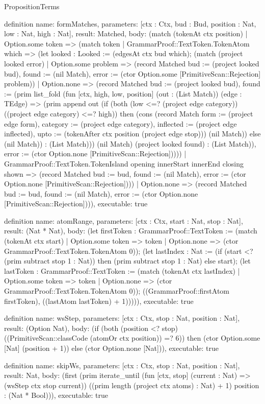 \begin{lexlean}{PropositionTerms}
\begin{semanticmodule}
definition{
  name: formMatches,
  parameters: [ctx : Ctx, bud : Bud, position : Nat, low : Nat, high : Nat],
  result: Matched,
  body: (match (tokenAt ctx position)
    | Option.some token => (match token
      | GrammarProof::TextToken.TokenAtom which => (let looked : Looked := (edgesAt ctx bud which); (match (project looked error)
        | Option.some problem => (record Matched {bud := (project looked bud), found := (nil Match), error := (ctor Option.some [PrimitiveScan::Rejection] problem)})
        | Option.none => (record Matched {bud := (project looked bud), found := (prim list_fold (fun [ctx, high, low, position] (out : (List Match)) (edge : TEdge) => (prim append out (if (both (low <=? (project edge category)) ((project edge category) <=? high)) then (cons (record Match {form := (project edge form), category := (project edge category), inflected := (project edge inflected), upto := (tokenAfter ctx position (project edge stop))}) (nil Match)) else (nil Match)) : (List Match))) (nil Match) (project looked found) : (List Match)), error := (ctor Option.none [PrimitiveScan::Rejection])})))
      | GrammarProof::TextToken.TokenIsland opening innerStart innerEnd closing shown => (record Matched {bud := bud, found := (nil Match), error := (ctor Option.none [PrimitiveScan::Rejection])}))
    | Option.none => (record Matched {bud := bud, found := (nil Match), error := (ctor Option.none [PrimitiveScan::Rejection])})),
  executable: true
}

definition{
  name: atomRange,
  parameters: [ctx : Ctx, start : Nat, stop : Nat],
  result: (Nat * Nat),
  body: (let firstToken : GrammarProof::TextToken := (match (tokenAt ctx start)
    | Option.some token => token
    | Option.none => (ctor GrammarProof::TextToken.TokenAtom 0)); (let lastIndex : Nat := (if (start <? (prim subtract stop 1 : Nat)) then (prim subtract stop 1 : Nat) else start); (let lastToken : GrammarProof::TextToken := (match (tokenAt ctx lastIndex)
    | Option.some token => token
    | Option.none => (ctor GrammarProof::TextToken.TokenAtom 0)); ((GrammarProof::firstAtom firstToken), ((lastAtom lastToken) + 1))))),
  executable: true
}

definition{
  name: wsStep,
  parameters: [ctx : Ctx, stop : Nat, position : Nat],
  result: (Option Nat),
  body: (if (both (position <? stop) ((PrimitiveScan::classCode (atomOr ctx position)) =? 6)) then (ctor Option.some [Nat] (position + 1)) else (ctor Option.none [Nat])),
  executable: true
}

definition{
  name: skipWs,
  parameters: [ctx : Ctx, stop : Nat, position : Nat],
  result: Nat,
  body: (first (prim iterate_until (fun [ctx, stop] (current : Nat) => (wsStep ctx stop current)) ((prim length (project ctx atoms) : Nat) + 1) position : (Nat * Bool))),
  executable: true
}


\end{semanticmodule}
\end{lexlean}
